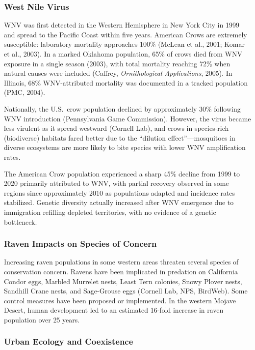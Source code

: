 \documentclass[11pt,letterpaper]{article}
\begin{document}
\subsubsection{West Nile Virus}

WNV was first detected in the Western Hemisphere in New York City in 1999 and spread to the Pacific Coast within five years. American Crows are extremely susceptible: laboratory mortality approaches 100\% (McLean et al., 2001; Komar et al., 2003). In a marked Oklahoma population, 65\% of crows died from WNV exposure in a single season (2003), with total mortality reaching 72\% when natural causes were included (Caffrey, \textit{Ornithological Applications}, 2005). In Illinois, 68\% WNV-attributed mortality was documented in a tracked population (PMC, 2004).

Nationally, the U.S.\ crow population declined by approximately 30\% following WNV introduction (Pennsylvania Game Commission). However, the virus became less virulent as it spread westward (Cornell Lab), and crows in species-rich (biodiverse) habitats fared better due to the ``dilution effect''---mosquitoes in diverse ecosystems are more likely to bite species with lower WNV amplification rates.

The American Crow population experienced a sharp 45\% decline from 1999 to 2020 primarily attributed to WNV, with partial recovery observed in some regions since approximately 2010 as populations adapted and incidence rates stabilized. Genetic diversity actually increased after WNV emergence due to immigration refilling depleted territories, with no evidence of a genetic bottleneck.

\subsubsection{Raven Impacts on Species of Concern}

Increasing raven populations in some western areas threaten several species of conservation concern. Ravens have been implicated in predation on California Condor eggs, Marbled Murrelet nests, Least Tern colonies, Snowy Plover nests, Sandhill Crane nests, and Sage-Grouse eggs (Cornell Lab, NPS, BirdWeb). Some control measures have been proposed or implemented. In the western Mojave Desert, human development led to an estimated 16-fold increase in raven population over 25 years.

\subsubsection{Urban Ecology and Coexistence}
\end{document}

